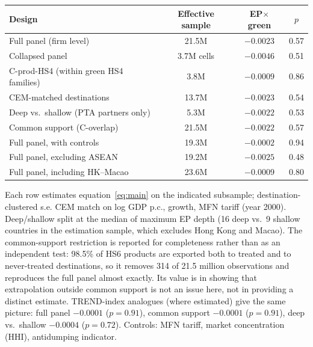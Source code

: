 \small
\begin{threeparttable}
\begin{tabular}{lccc}
\toprule
Design & Effective sample & EP$\times$green & $p$ \\
\midrule
Full panel (firm level) & 21.5M & $-0.0023$ & 0.57 \\
Collapsed panel & 3.7M cells & $-0.0046$ & 0.51 \\
C-prod-HS4 (within green HS4 families) & 3.8M & $-0.0009$ & 0.86 \\
CEM-matched destinations & 13.7M & $-0.0023$ & 0.54 \\
Deep vs.\ shallow (PTA partners only) & 5.3M & $-0.0022$ & 0.53 \\
Common support (C-overlap) & 21.5M & $-0.0022$ & 0.57 \\
Full panel, with controls & 19.3M & $-0.0002$ & 0.94 \\
Full panel, excluding ASEAN & 19.2M & $-0.0025$ & 0.48 \\
Full panel, including HK--Macao & 23.6M & $-0.0009$ & 0.80 \\
\bottomrule
\end{tabular}
\begin{tablenotes}\footnotesize
\item Each row estimates equation~\eqref{eq:main} on the indicated subsample;
destination-clustered s.e. CEM match on log GDP p.c., growth, MFN tariff (year 2000).
Deep/shallow split at the median of maximum EP depth (16 deep vs.\ 9 shallow countries
in the estimation sample, which excludes Hong Kong and Macao).
The common-support restriction is reported for completeness rather than as an
independent test: 98.5\% of HS6 products are exported both to treated and to
never-treated destinations, so it removes 314 of 21.5 million observations and reproduces
the full panel almost exactly. Its value is in showing that extrapolation outside common
support is not an issue here, not in providing a distinct estimate.
TREND-index analogues (where estimated) give the same picture: full panel $-0.0001$
($p=0.91$), common support $-0.0001$ ($p=0.91$), deep vs.\ shallow $-0.0004$ ($p=0.72$).
Controls: MFN tariff, market concentration (HHI), antidumping indicator.
\end{tablenotes}
\end{threeparttable}
